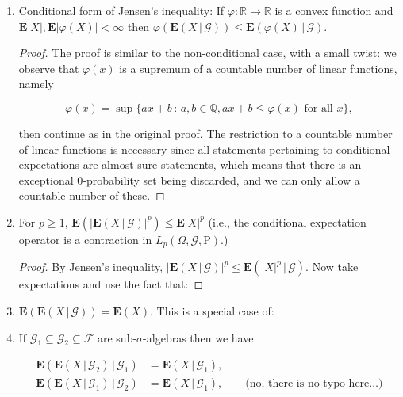 \documentclass[11pt]{report}
\newcommand{\R}{\mathbb{R}}
\theoremstyle{plain}
\theoremstyle{definition}
\begin{document}
\begin{enumerate}[label=\arabic*.]
\begin{proof}
\noindent Thus $Z$, qualifies as the conditional expectation of
$X$ given $\mathcal{G}$.
\end{proof}

\item Conditional form of Jensen's inequality: If
$\varphi:\R\to\R$ is a convex function and
$\mathbf{E}|X|, \mathbf{E}|\varphi(X)|<\infty$ then
$\varphi(\mathbf{E}\left(X\,|\,\mathcal{G}\right))
\le
\mathbf{E}\left(\varphi(X)\,|\,\mathcal{G}\right).$

\begin{proof}
The proof is similar to the non-conditional case,
with a small twist: we observe that $\varphi(x)$ is a
supremum of a countable number of linear functions,
namely

\[
\varphi(x) = \sup \{ ax+b\,:\,a,b\in \mathbb{Q}, ax+b\le \varphi(x)\textrm{ for all }x\},
\]

\noindent then continue as in the original proof. The
restriction to a countable number of linear functions
is necessary since all statements pertaining to
conditional expectations are almost sure statements,
which means that there is an exceptional
$0$-probability set being discarded, and we can only
allow a countable number of these.
\end{proof}

\item For $p\ge 1$,
$\mathbf{E}\left(
\left|\mathbf{E}\left(X\,|\,\mathcal{G}\right)\right|^p
\right) \le \mathbf{E}|X|^p$
(i.e., the conditional expectation operator is a
contraction in $L_p(\Omega,\mathcal{G},\mathrm{P})$.)

\begin{proof}
By Jensen's inequality,
$|\mathbf{E}\left(X\,|\,\mathcal{G}\right)|^p \le
\mathbf{E}\left(|X|^p\,|\,\mathcal{G}\right)$.
Now take expectations and use the fact that:
\end{proof}

\item $\mathbf{E}(\mathbf{E}\left(X\,|\,\mathcal{G}\right))
= \mathbf{E}(X)$.
This is a special case of:

\item If
$\mathcal{G}_1\subseteq \mathcal{G}_2 \subseteq
\mathcal{F}$
are sub-$\sigma$-algebras then we have

\begin{align*}
\mathbf{E}\left(\mathbf{E}\left(X\,|\,\mathcal{G}_2\right)\,|\,\mathcal{G}_1\right) &= \mathbf{E}\left(X\,|\,\mathcal{G}_1\right), \\
\mathbf{E}\left(\mathbf{E}\left(X\,|\,\mathcal{G}_1\right)\,|\,\mathcal{G}_2\right) &= \mathbf{E}\left(X\,|\,\mathcal{G}_1\right),
\qquad  \textrm{(no, there is no typo here\ldots)}
\end{align*}


\end{enumerate}
\end{document}
